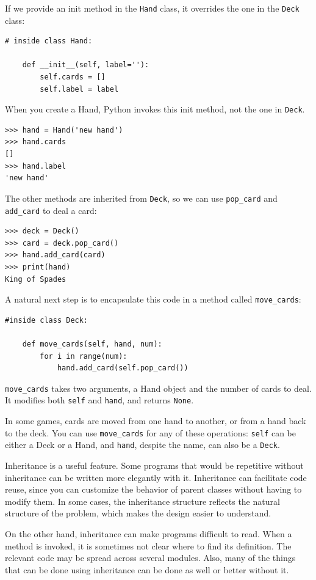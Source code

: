 \documentclass[10pt]{book}
\begin{document}
If we provide an init method in the {\tt Hand} class, it overrides the
one in the {\tt Deck} class:

\begin{verbatim}
# inside class Hand:

    def __init__(self, label=''):
        self.cards = []
        self.label = label
\end{verbatim}
%
When you create a Hand, Python invokes this init method, not the
one in {\tt Deck}.

\begin{verbatim}
>>> hand = Hand('new hand')
>>> hand.cards
[]
>>> hand.label
'new hand'
\end{verbatim}
%
The other methods are inherited from {\tt Deck}, so we can use
\verb"pop_card" and \verb"add_card" to deal a card:

\begin{verbatim}
>>> deck = Deck()
>>> card = deck.pop_card()
>>> hand.add_card(card)
>>> print(hand)
King of Spades
\end{verbatim}
%
A natural next step is to encapsulate this code in a method
called \verb"move_cards":

\begin{verbatim}
#inside class Deck:

    def move_cards(self, hand, num):
        for i in range(num):
            hand.add_card(self.pop_card())
\end{verbatim}
%
\verb"move_cards" takes two arguments, a Hand object and the number of
cards to deal.  It modifies both {\tt self} and {\tt hand}, and
returns {\tt None}.

In some games, cards are moved from one hand to another,
or from a hand back to the deck.  You can use \verb"move_cards"
for any of these operations: {\tt self} can be either a Deck
or a Hand, and {\tt hand}, despite the name, can also be a {\tt Deck}.

Inheritance is a useful feature.  Some programs that would be
repetitive without inheritance can be written more elegantly
with it.  Inheritance can facilitate code reuse, since you can
customize the behavior of parent classes without having to modify
them.  In some cases, the inheritance structure reflects the natural
structure of the problem, which makes the design easier to
understand.

On the other hand, inheritance can make programs difficult to read.
When a method is invoked, it is sometimes not clear where to find its
definition.  The relevant code may be spread across several modules.
Also, many of the things that can be done using inheritance can be
done as well or better without it.
\end{document}
